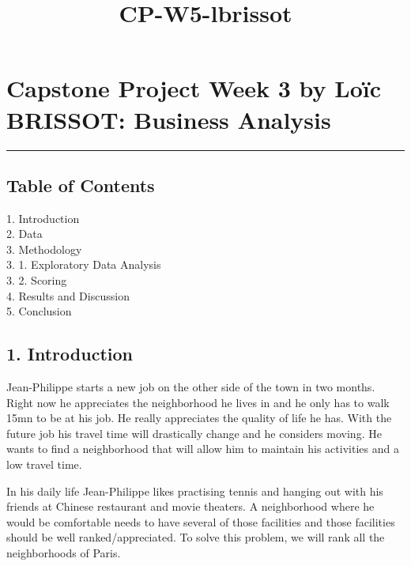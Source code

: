 \documentclass[11pt]{article}
\title{CP-W5-lbrissot}
\begin{document}
    
    
    \maketitle
    
    

    
    \section{Capstone Project Week 3 by Loïc BRISSOT: Business
Analysis}\label{capstone-project-week-3-by-louxefc-brissot-business-analysis}

\begin{center}\rule{0.5\linewidth}{\linethickness}\end{center}

\subsection{Table of Contents}\label{table-of-contents}

 1. Introduction \\
2. Data\\
3. Methodology \\
3. 1. Exploratory Data Analysis \\
3. 2. Scoring \\
4. Results and Discussion\\
5. Conclusion \\

    \subsection{1. Introduction}\label{introduction}

Jean-Philippe starts a new job on the other side of the town in two
months. Right now he appreciates the neighborhood he lives in and he
only has to walk 15mn to be at his job. He really appreciates the
quality of life he has. With the future job his travel time will
drastically change and he considers moving. He wants to find a
neighborhood that will allow him to maintain his activities and a low
travel time.

In his daily life Jean-Philippe likes practising tennis and hanging out
with his friends at Chinese restaurant and movie theaters. A
neighborhood where he would be comfortable needs to have several of
those facilities and those facilities should be well ranked/appreciated.
To solve this problem, we will rank all the neighborhoods of Paris.
\end{document}
